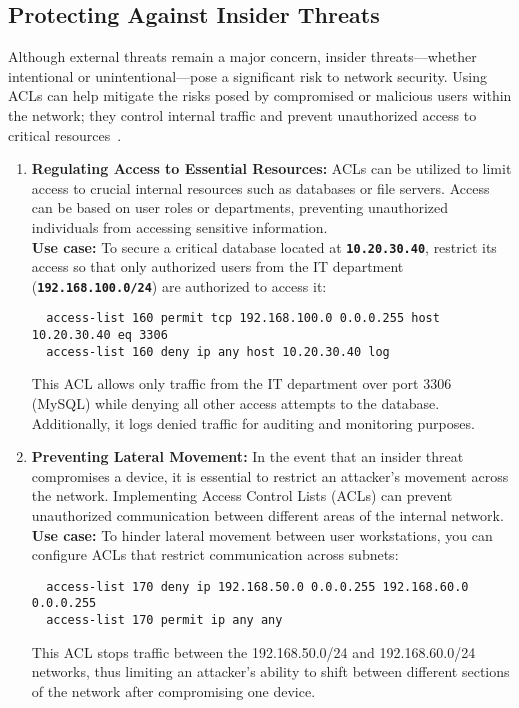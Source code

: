 \documentclass[11pt,a4paper]{article}
\begin{document}
    \subsection*{Protecting Against Insider Threats}
    Although external threats remain a major concern, insider threats—whether intentional or unintentional—pose a significant risk to network security. Using ACLs can help mitigate the risks posed by compromised or malicious users within the network; they control internal traffic and prevent unauthorized access to critical resources~\cite{Insider-Threats}.

        \begin{enumerate}
            \item \textbf{Regulating Access to Essential Resources:} ACLs can be utilized to limit access to crucial internal resources such as databases or file servers. Access can be based on user roles or departments, preventing unauthorized individuals from accessing sensitive information.
            \\[1em]
            \textbf{Use case:} To secure a critical database located at \textbf{\lstinline{10.20.30.40}}, restrict its access so that only authorized users from the IT department (\textbf{\lstinline{192.168.100.0/24}}) are authorized to access it:
\begin{lstlisting}
  access-list 160 permit tcp 192.168.100.0 0.0.0.255 host 10.20.30.40 eq 3306
  access-list 160 deny ip any host 10.20.30.40 log                            
\end{lstlisting}
            This ACL allows only traffic from the IT department over port 3306 (MySQL) while denying all other access attempts to the database. Additionally, it logs denied traffic for auditing and monitoring purposes.

            \item \textbf{Preventing Lateral Movement:} In the event that an insider threat compromises a device, it is essential to restrict an attacker’s movement across the network. Implementing Access Control Lists (ACLs) can prevent unauthorized communication between different areas of the internal network.
            \\[1em]
            \textbf{Use case:} To hinder lateral movement between user workstations, you can configure ACLs that restrict communication across subnets:
\begin{lstlisting}
  access-list 170 deny ip 192.168.50.0 0.0.0.255 192.168.60.0 0.0.0.255
  access-list 170 permit ip any any                            
\end{lstlisting}
            This ACL stops traffic between the 192.168.50.0/24 and 192.168.60.0/24 networks, thus limiting an attacker’s ability to shift between different sections of the network after compromising one device.


\end{enumerate}
\end{document}
